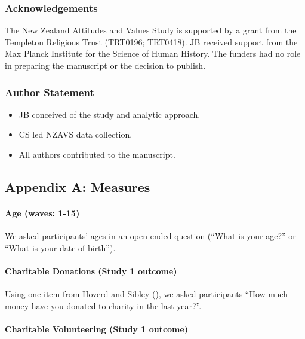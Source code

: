 \documentclass[
  single column]{article}
\let\oldparagraph\paragraph
\renewcommand{\paragraph}[1]{\oldparagraph{#1}\mbox{}}
\providecommand{\tightlist}{%
  \setlength{\itemsep}{0pt}\setlength{\parskip}{0pt}}\usepackage{longtable,booktabs,array}
\begin{document}
\subsubsection{Acknowledgements}\label{acknowledgements}

The New Zealand Attitudes and Values Study is supported by a grant from
the Templeton Religious Trust (TRT0196; TRT0418). JB received support
from the Max Planck Institute for the Science of Human History. The
funders had no role in preparing the manuscript or the decision to
publish.

\subsubsection{Author Statement}\label{author-statement}

\begin{itemize}
\tightlist
\item
  JB conceived of the study and analytic approach.\\
\item
  CS led NZAVS data collection.
\item
  All authors contributed to the manuscript.
\end{itemize}

\newpage{}

\subsection{Appendix A: Measures}\label{appendix-measures}

\paragraph{Age (waves: 1-15)}\label{age-waves-1-15}

We asked participants' ages in an open-ended question (``What is your
age?'' or ``What is your date of birth'').

\paragraph{Charitable Donations (Study 1
outcome)}\label{charitable-donations-study-1-outcome}

Using one item from Hoverd and Sibley
(), we asked participants
``How much money have you donated to charity in the last year?''.

\paragraph{Charitable Volunteering (Study 1
outcome)}\label{charitable-volunteering-study-1-outcome}
\end{document}
